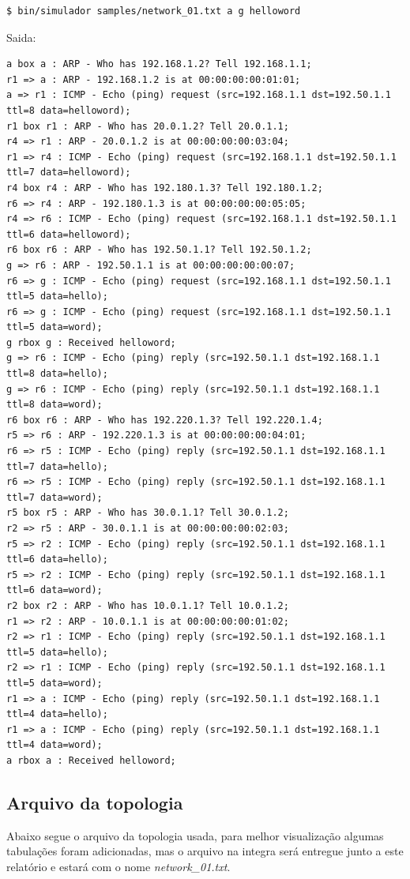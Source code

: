 \documentclass[12pt]{article}
\begin{document}
\begin{lstlisting}[breaklines=true,language=sh]
$ bin/simulador samples/network_01.txt a g helloword
\end{lstlisting}


Saida:


\begin{lstlisting}[breaklines=true]
a box a : ARP - Who has 192.168.1.2? Tell 192.168.1.1;
r1 => a : ARP - 192.168.1.2 is at 00:00:00:00:01:01;
a => r1 : ICMP - Echo (ping) request (src=192.168.1.1 dst=192.50.1.1 ttl=8 data=helloword);
r1 box r1 : ARP - Who has 20.0.1.2? Tell 20.0.1.1;
r4 => r1 : ARP - 20.0.1.2 is at 00:00:00:00:03:04;
r1 => r4 : ICMP - Echo (ping) request (src=192.168.1.1 dst=192.50.1.1 ttl=7 data=helloword);
r4 box r4 : ARP - Who has 192.180.1.3? Tell 192.180.1.2;
r6 => r4 : ARP - 192.180.1.3 is at 00:00:00:00:05:05;
r4 => r6 : ICMP - Echo (ping) request (src=192.168.1.1 dst=192.50.1.1 ttl=6 data=helloword);
r6 box r6 : ARP - Who has 192.50.1.1? Tell 192.50.1.2;
g => r6 : ARP - 192.50.1.1 is at 00:00:00:00:00:07;
r6 => g : ICMP - Echo (ping) request (src=192.168.1.1 dst=192.50.1.1 ttl=5 data=hello);
r6 => g : ICMP - Echo (ping) request (src=192.168.1.1 dst=192.50.1.1 ttl=5 data=word);
g rbox g : Received helloword;
g => r6 : ICMP - Echo (ping) reply (src=192.50.1.1 dst=192.168.1.1 ttl=8 data=hello);
g => r6 : ICMP - Echo (ping) reply (src=192.50.1.1 dst=192.168.1.1 ttl=8 data=word);
r6 box r6 : ARP - Who has 192.220.1.3? Tell 192.220.1.4;
r5 => r6 : ARP - 192.220.1.3 is at 00:00:00:00:04:01;
r6 => r5 : ICMP - Echo (ping) reply (src=192.50.1.1 dst=192.168.1.1 ttl=7 data=hello);
r6 => r5 : ICMP - Echo (ping) reply (src=192.50.1.1 dst=192.168.1.1 ttl=7 data=word);
r5 box r5 : ARP - Who has 30.0.1.1? Tell 30.0.1.2;
r2 => r5 : ARP - 30.0.1.1 is at 00:00:00:00:02:03;
r5 => r2 : ICMP - Echo (ping) reply (src=192.50.1.1 dst=192.168.1.1 ttl=6 data=hello);
r5 => r2 : ICMP - Echo (ping) reply (src=192.50.1.1 dst=192.168.1.1 ttl=6 data=word);
r2 box r2 : ARP - Who has 10.0.1.1? Tell 10.0.1.2;
r1 => r2 : ARP - 10.0.1.1 is at 00:00:00:00:01:02;
r2 => r1 : ICMP - Echo (ping) reply (src=192.50.1.1 dst=192.168.1.1 ttl=5 data=hello);
r2 => r1 : ICMP - Echo (ping) reply (src=192.50.1.1 dst=192.168.1.1 ttl=5 data=word);
r1 => a : ICMP - Echo (ping) reply (src=192.50.1.1 dst=192.168.1.1 ttl=4 data=hello);
r1 => a : ICMP - Echo (ping) reply (src=192.50.1.1 dst=192.168.1.1 ttl=4 data=word);
a rbox a : Received helloword;
\end{lstlisting}

\subsection{Arquivo da topologia}
Abaixo segue o arquivo da topologia usada, para melhor visualização algumas tabulações foram adicionadas, mas o arquivo na integra será entregue junto a este relatório e estará com o nome \emph{network\_01.txt}.
\end{document}
